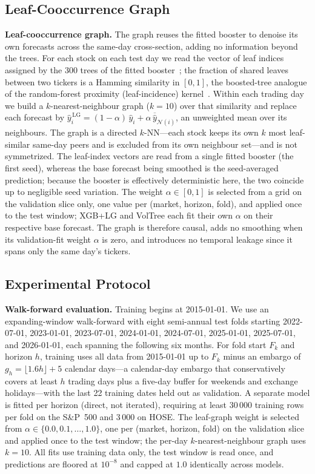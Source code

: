 \documentclass[runningheads,a4paper]{llncs}
\begin{document}
\subsection{Leaf-Cooccurrence Graph}
\textbf{Leaf-cooccurrence graph.} The graph reuses the fitted booster to denoise its own forecasts across
the same-day cross-section, adding no information beyond the trees. For each stock on each test day we read
the vector of leaf indices assigned by the 300 trees of the fitted booster~\cite{chen2016}; the fraction
of shared leaves between two tickers is a Hamming similarity in $[0,1]$, the boosted-tree analogue of the
random-forest proximity (leaf-incidence) kernel~\cite{rhodes2023}. Within each trading day we build a $k$-nearest-neighbour graph
($k=10$) over that similarity and replace each forecast by
$\hat y_i^{\,\mathrm{LG}}=(1-\alpha)\,\hat y_i+\alpha\,\overline{\hat y}_{\mathcal{N}(i)}$, an unweighted
mean over its neighbours. The graph is a directed $k$-NN---each stock keeps its own $k$ most leaf-similar
same-day peers and is excluded from its own neighbour set---and is not symmetrized. The leaf-index vectors
are read from a single fitted booster (the first seed), whereas the base forecast being smoothed is the
seed-averaged prediction; because the booster is effectively deterministic here, the two coincide up to
negligible seed variation. The weight $\alpha\in[0,1]$ is selected from a grid on the validation slice only,
one value per (market, horizon, fold), and applied once to the test window; XGB+LG and VolTree each fit
their own $\alpha$ on their respective base forecast. The graph is therefore causal, adds no smoothing
when its validation-fit weight $\alpha$ is zero, and introduces no temporal leakage since it spans only the same
day's tickers.

\subsection{Experimental Protocol}
\textbf{Walk-forward evaluation.} Training begins at 2015-01-01. We use an expanding-window walk-forward
with eight semi-annual test folds starting 2022-07-01, 2023-01-01, 2023-07-01, 2024-01-01, 2024-07-01,
2025-01-01, 2025-07-01, and 2026-01-01, each spanning the following six months. For fold start $F_k$ and
horizon $h$, training uses all data from 2015-01-01 up to $F_k$ minus an embargo of
$g_h=\lfloor 1.6h\rfloor+5$ calendar days---a calendar-day embargo that conservatively covers at least $h$
trading days plus a five-day buffer for weekends and exchange holidays---with the last 22 training dates
held out as validation. A
separate model is fitted per horizon (direct, not iterated), requiring at least 30\,000 training rows per
fold on the S\&P~500 and 3\,000 on HOSE. The leaf-graph weight is selected from
$\alpha\in\{0.0,0.1,\dots,1.0\}$, one per (market, horizon, fold) on the validation slice and applied once
to the test window; the per-day $k$-nearest-neighbour graph uses $k=10$. All fits use training data only,
the test window is read once, and predictions are floored at $10^{-8}$ and capped at $1.0$ identically
across models.
\end{document}
